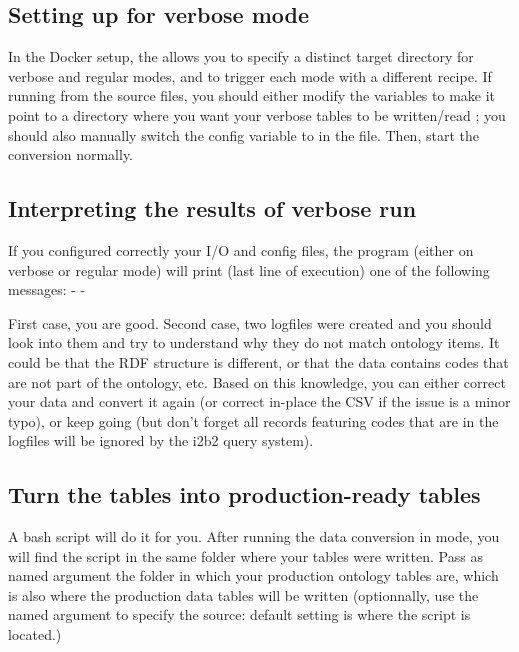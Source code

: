\documentclass[letterpaper,10pt,english]{sphinxmanual}
\begin{document}
\subsection{Setting up for verbose mode}
\label{\detokenize{verbose:setting-up-for-verbose-mode}}
In the Docker setup, the {\hyperref[\detokenize{docker:makefile}]{}} allows you to specify a distinct target directory for verbose and regular modes, and to trigger each mode with a different recipe.
If running from the source files, you should either modify the  variables to make it point to a directory where you want your verbose tables to be written/read ; you should also manually switch the  config variable to  in the  file. Then, start the conversion normally.


\subsection{Interpreting the results of verbose run}
\label{\detokenize{verbose:interpreting-the-results-of-verbose-run}}
If you configured correctly your I/O and config files, the program (either on verbose or regular mode)  will print (last line of execution) one of the following messages:
- 
- 

First case, you are good.
Second case, two logfiles were created and you should look into them and try to understand why they do not match ontology items. It could be that the RDF structure is different, or that the data contains codes that are not part of the ontology, etc. Based on this knowledge, you can either correct your data and convert it again (or correct in-place the CSV if the issue is a minor typo), or keep going (but don’t forget all records featuring codes that are in the logfiles will be ignored by the i2b2 query system).


\subsection{Turn the  tables into production-ready tables}
\label{\detokenize{verbose:turn-the-verbose-tables-into-production-ready-tables}}
A bash script will do it for you. After running the data conversion in  mode, you will find the script  in the same folder where your  tables were written. Pass as named argument  the folder in which your production ontology tables are, which is also where the production data tables will be written (optionnally, use the named argument  to specify the source: default setting is where the script is located.)
\end{document}
